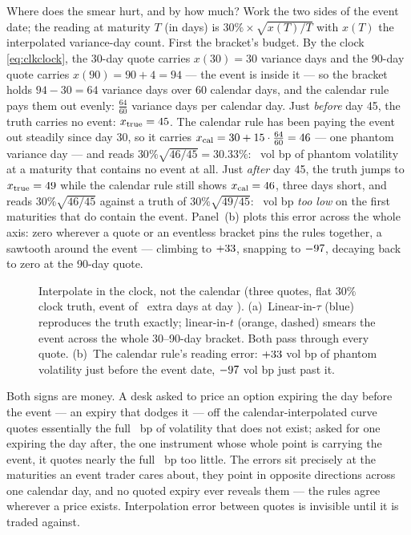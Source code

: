Where does the smear hurt, and by how much?  Work the two sides of
the event date; the reading at maturity $T$ (in days) is
$30\%\times\sqrt{x(T)/T}$ with $x(T)$ the interpolated variance-day
count.  First the bracket's budget.  By the clock
\eqref{eq:clkclock}, the 30-day quote carries $x(30)=30$ variance
days and the 90-day quote carries $x(90)=90+4=94$ --- the event is
inside it --- so the bracket holds $94-30=64$ variance days over
$60$ calendar days, and the calendar rule pays them out evenly:
$\tfrac{64}{60}$ variance days per calendar day.  Just \emph{before} day 45, the truth carries no event:
$x_{\rm true}=45$.  The calendar rule has been paying the event out
steadily since day 30, so it carries
$x_{\rm cal}=30+15\cdot\tfrac{64}{60}=46$ --- one phantom variance
day --- and reads
$30\%\sqrt{46/45}=30.33\%$: \MacClkInterpOverBp\ vol bp of phantom
volatility at a maturity that contains no event at all.  Just
\emph{after} day 45, the truth jumps to $x_{\rm true}=49$ while the
calendar rule still shows $x_{\rm cal}=46$, three days short, and
reads $30\%\sqrt{46/45}$ against a truth of $30\%\sqrt{49/45}$:
\MacClkInterpUnderBp\ vol bp \emph{too low} on the first maturities
that do contain the event.  Panel~(b) plots this error across the
whole axis: zero wherever a quote or an eventless bracket pins the
rules together, a sawtooth around the event --- climbing to
$+33$, snapping to $-97$, decaying
back to zero at the 90-day quote.

\begin{figure}[htbp]
\centering
{}
\caption{Interpolate in the clock, not the calendar (three quotes,
flat $30\%$ clock truth, event of \MacClkClockExtraDays\ extra days at
day \MacClkInterpOverDay).  (a)~Linear-in-$\tau$ (blue) reproduces the
truth exactly; linear-in-$t$ (orange, dashed) smears the event across
the whole 30--90-day bracket.  Both pass through every quote.
(b)~The calendar rule's reading error: $+33$ vol bp
of phantom volatility just before the event date,
$-97$ vol bp just past it.}
\label{fig:clkinterp}
\end{figure}

Both signs are money.  A desk asked to price an option expiring the
day before the event --- an expiry that dodges it --- off the
calendar-interpolated curve quotes essentially the full
\MacClkInterpOverBp\ bp of volatility that does not exist; asked for
one expiring the day after, the one instrument whose whole point is
carrying the event, it quotes nearly the full \MacClkInterpUnderBp\
bp too little.  The errors sit precisely at the maturities an event
trader cares about, they point in opposite directions across one
calendar day, and no quoted expiry ever reveals them --- the rules
agree wherever a price exists.  Interpolation error between quotes
is invisible until it is traded against.

